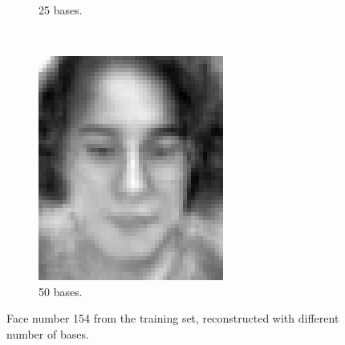 \documentclass[a4paper, 10pt, conference]{ieeeconf}
\begin{document}
\begin{figure}[!ht]
\begin{subfigure}{0.1\textwidth}
          \caption{25 bases.}
        \end{subfigure}
        ~
        \begin{subfigure}{0.1\textwidth}
          \includegraphics[width=\textwidth]{src/reface13.png}
          \caption{50 bases.}
        \end{subfigure}

	\caption{Face number 154 from the training set, reconstructed with different number of bases.}
  \label{fig:reconex1}
\end{figure}
\end{document}
